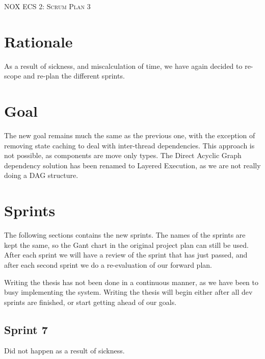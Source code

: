 \documentclass[hidelinks]{article}
\begin{document}
\begin{titlepage}
    \centering
    {\scshape\LARGE NOX ECS 2: Scrum Plan 3 \par}
    \vfill
    {\large \date{}\par}
\end{titlepage}

\tableofcontents
\pagebreak

\section{Rationale}
As a result of sickness, and miscalculation of time, we have again decided to re-scope and re-plan the different sprints.

\section{Goal}
The new goal remains much the same as the previous one, with the exception of removing state caching to deal with inter-thread dependencies.
This approach is not possible, as components are move only types. 
The Direct Acyclic Graph dependency solution has been renamed to Layered Execution, as we are not really doing a DAG structure.

\section{Sprints}
The following sections contains the new sprints. The names of the sprints are kept the same, so the Gant chart in the original project plan can still be used.
After each sprint we will have a review of the sprint that has just passed, and after each second sprint we do a re-evaluation of our forward plan.

Writing the thesis has not been done in a continuous manner, as we have been to busy implementing the system. 
Writing the thesis will begin either after all dev sprints are finished, or start getting ahead of our goals.

\subsection{Sprint 7}
Did not happen as a result of sickness.
\end{document}
